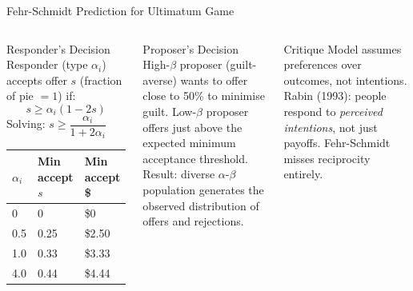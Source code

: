 \documentclass[aspectratio=169]{beamer}
\begin{document}
\begin{frame}{Fehr-Schmidt Prediction for Ultimatum Game}
\begin{columns}
\begin{block}{Responder's Decision}
Responder (type $\alpha_i$) accepts offer $s$ (fraction of pie $= 1$) if:
\[
  s \geq \alpha_i(1-2s)
\]
Solving: \quad $s \geq \dfrac{\alpha_i}{1+2\alpha_i}$\\[0.5em]
\begin{tabular}{lll}
\toprule $\alpha_i$ & Min accept $s$ & Min accept \$\\
\midrule 0 & 0 & \$0\\
0.5 & 0.25 & \$2.50\\
1.0 & 0.33 & \$3.33\\
4.0 & 0.44 & \$4.44\\
\bottomrule\end{tabular}
\end{block}
\begin{block}{Proposer's Decision}
High-$\beta$ proposer (guilt-averse) wants to offer close to 50\% to minimise guilt. Low-$\beta$ proposer offers just above the expected minimum acceptance threshold.\\[0.5em]
Result: diverse $\alpha$-$\beta$ population generates the observed distribution of offers and rejections.
\end{block}
\begin{alertblock}{Critique}
Model assumes preferences over outcomes, not intentions. Rabin (1993): people respond to \textit{perceived intentions}, not just payoffs. Fehr-Schmidt misses reciprocity entirely.
\end{alertblock}
\end{columns}
\end{frame}
\end{document}
